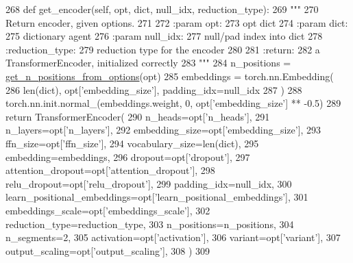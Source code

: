 \begin{DoxyCode}
268     \textcolor{keyword}{def }get\_encoder(self, opt, dict, null\_idx, reduction\_type):
269         \textcolor{stringliteral}{"""}
270 \textcolor{stringliteral}{        Return encoder, given options.}
271 \textcolor{stringliteral}{}
272 \textcolor{stringliteral}{        :param opt:}
273 \textcolor{stringliteral}{            opt dict}
274 \textcolor{stringliteral}{        :param dict:}
275 \textcolor{stringliteral}{            dictionary agent}
276 \textcolor{stringliteral}{        :param null\_idx:}
277 \textcolor{stringliteral}{            null/pad index into dict}
278 \textcolor{stringliteral}{        :reduction\_type:}
279 \textcolor{stringliteral}{            reduction type for the encoder}
280 \textcolor{stringliteral}{}
281 \textcolor{stringliteral}{        :return:}
282 \textcolor{stringliteral}{            a TransformerEncoder, initialized correctly}
283 \textcolor{stringliteral}{        """}
284         n\_positions = \hyperlink{namespaceparlai_1_1agents_1_1transformer_1_1modules_ab67607512c597ddd54f2b60a1a1eaf4c}{get\_n\_positions\_from\_options}(opt)
285         embeddings = torch.nn.Embedding(
286             len(dict), opt[\textcolor{stringliteral}{'embedding\_size'}], padding\_idx=null\_idx
287         )
288         torch.nn.init.normal\_(embeddings.weight, 0, opt[\textcolor{stringliteral}{'embedding\_size'}] ** -0.5)
289         \textcolor{keywordflow}{return} TransformerEncoder(
290             n\_heads=opt[\textcolor{stringliteral}{'n\_heads'}],
291             n\_layers=opt[\textcolor{stringliteral}{'n\_layers'}],
292             embedding\_size=opt[\textcolor{stringliteral}{'embedding\_size'}],
293             ffn\_size=opt[\textcolor{stringliteral}{'ffn\_size'}],
294             vocabulary\_size=len(dict),
295             embedding=embeddings,
296             dropout=opt[\textcolor{stringliteral}{'dropout'}],
297             attention\_dropout=opt[\textcolor{stringliteral}{'attention\_dropout'}],
298             relu\_dropout=opt[\textcolor{stringliteral}{'relu\_dropout'}],
299             padding\_idx=null\_idx,
300             learn\_positional\_embeddings=opt[\textcolor{stringliteral}{'learn\_positional\_embeddings'}],
301             embeddings\_scale=opt[\textcolor{stringliteral}{'embeddings\_scale'}],
302             reduction\_type=reduction\_type,
303             n\_positions=n\_positions,
304             n\_segments=2,
305             activation=opt[\textcolor{stringliteral}{'activation'}],
306             variant=opt[\textcolor{stringliteral}{'variant'}],
307             output\_scaling=opt[\textcolor{stringliteral}{'output\_scaling'}],
308         )
309 
\end{DoxyCode}
\mbox{\label{classparlai_1_1agents_1_1transformer_1_1polyencoder_1_1PolyEncoderModule_a52218a8c0594ff4d5bf8e666dc38f508}} 
